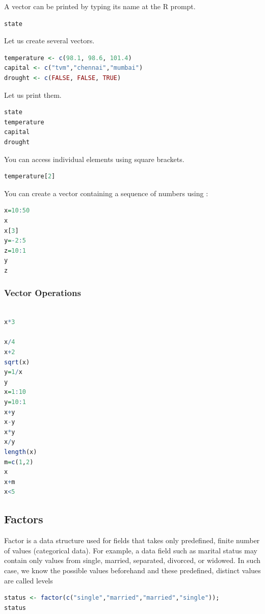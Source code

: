 \documentclass["../Applied_probabillity _and_statistics_lab_KTU.tex"]{subfiles}
\begin{document}
 A vector can be printed by typing its name at the R prompt.
    \begin{lstlisting}[language=R]
state
\end{lstlisting}
 Let us create several vectors.

    \begin{lstlisting}[language=R]
temperature <- c(98.1, 98.6, 101.4)
capital <- c("tvm","chennai","mumbai")
drought <- c(FALSE, FALSE, TRUE)
\end{lstlisting}
 Let us print them.

\begin{lstlisting}[language=R]
state
temperature
capital
drought

\end{lstlisting}
 

You can access individual elements using square brackets.
\begin{lstlisting}[language=R]
 temperature[2]
\end{lstlisting}



You can create a vector containing a sequence of numbers using :

\begin{lstlisting}[language=R]
 x=10:50
x
x[3]
y=-2:5
z=10:1
y
z
\end{lstlisting}

\subsubsection{Vector Operations}

\begin{lstlisting}[language=R]

x*3 

x/4
x+2
sqrt(x)
y=1/x
y
x=1:10
y=10:1
x+y
x-y
x*y
x/y
length(x)
m=c(1,2)
x
x+m
x<5
\end{lstlisting}

\subsection{Factors}
Factor is a data structure used for fields that takes only predefined, finite number of values (categorical data). For example, a data field such as marital status may contain only values from single, married, separated, divorced, or widowed. In such case, we know the possible values beforehand and these predefined, distinct values are called levels
\begin{lstlisting}[language=R]
status <- factor(c("single","married","married","single"));
status
\end{lstlisting}
\end{document}
